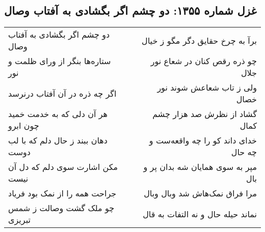 \begin{center}
\section*{غزل شماره ۱۳۵۵: دو چشم اگر بگشادی به آفتاب وصال}
\label{sec:1355}
\begin{longtable}{l p{0.5cm} r}
دو چشم اگر بگشادی به آفتاب وصال
&&
برآ به چرخ حقایق دگر مگو ز خیال
\\
ستاره‌ها بنگر از ورای ظلمت و نور
&&
چو ذره رقص کنان در شعاع نور جلال
\\
اگر چه ذره در آن آفتاب درنرسد
&&
ولی ز تاب شعاعش شوند نور خصال
\\
هر آن دلی که به خدمت خمید چون ابرو
&&
گشاد از نظرش صد هزار چشم کمال
\\
دهان ببند ز حال دلم که با لب دوست
&&
خدای داند کو را چه واقعه‌ست و چه حال
\\
مکن اشارت سوی دلم که دل آن نیست
&&
مپر به سوی همایان شه بدان پر و بال
\\
جراحت همه را از نمک بود فریاد
&&
مرا فراق نمک‌هاش شد وبال وبال
\\
چو ملک گشت وصالت ز شمس تبریزی
&&
نماند حیله حال و نه التفات به قال
\\
\end{longtable}
\end{center}
